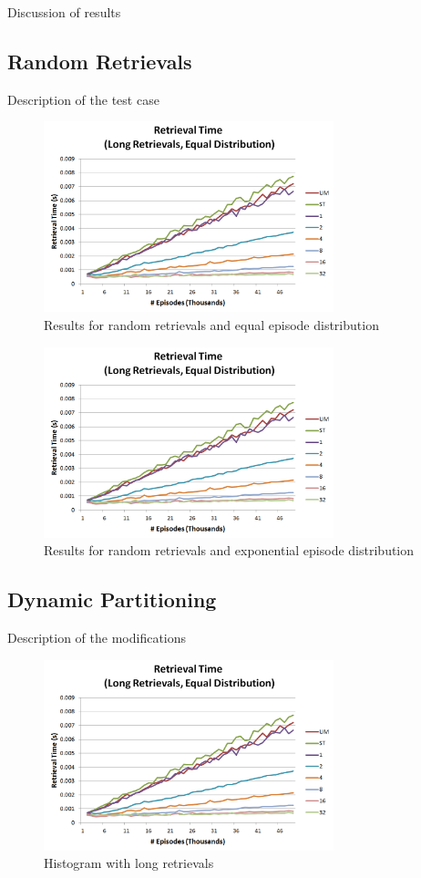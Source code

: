 \documentclass[11pt]{article} %
\begin{document}
Discussion of results

\subsection{Random Retrievals}
Description of the test case
\begin{figure}[h]
\caption{Results for random retrievals and equal episode distribution}
\centering
\includegraphics[width=0.75\textwidth]{images/ret_worst_eq}
\end{figure}

\begin{figure}[h]
\caption{Results for random retrievals and exponential episode distribution}
\centering
\includegraphics[width=0.75\textwidth]{images/ret_worst_eq}
\end{figure}

\subsection{Dynamic Partitioning}
Description of the modifications
\begin{figure}[h]
\caption{Histogram with long retrievals}
\centering
\includegraphics[width=0.75\textwidth]{images/ret_worst_eq}
\end{figure}
\end{document}
